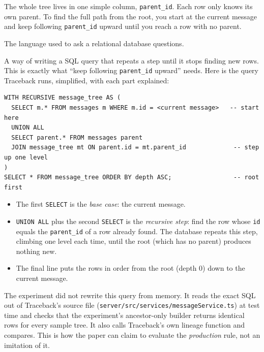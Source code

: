 \begin{plain}
The whole tree lives in one simple column, \texttt{parent\_id}. Each row only knows its own parent. To find the full path from the root, you start at the current message and keep following \texttt{parent\_id} upward until you reach a row with no parent.
\end{plain}

 The language used to ask a relational database questions.

 A way of writing a SQL query that repeats a step until it stops finding new rows. This is exactly what ``keep following \texttt{parent\_id} upward'' needs. Here is the query Traceback runs, simplified, with each part explained:

\begin{lstlisting}
WITH RECURSIVE message_tree AS (
  SELECT m.* FROM messages m WHERE m.id = <current message>   -- start here
  UNION ALL
  SELECT parent.* FROM messages parent
  JOIN message_tree mt ON parent.id = mt.parent_id             -- step up one level
)
SELECT * FROM message_tree ORDER BY depth ASC;                 -- root first
\end{lstlisting}

\begin{itemize}
\item The first \texttt{SELECT} is the \emph{base case}: the current message.
\item \texttt{UNION ALL} plus the second \texttt{SELECT} is the \emph{recursive step}: find the row whose \texttt{id} equals the \texttt{parent\_id} of a row already found. The database repeats this step, climbing one level each time, until the root (which has no parent) produces nothing new.
\item The final line puts the rows in order from the root (depth 0) down to the current message.
\end{itemize}

\begin{why}
The experiment did not rewrite this query from memory. It reads the exact SQL out of Traceback's source file (\texttt{server/src/services/messageService.ts}) at test time and checks that the experiment's ancestor-only builder returns identical rows for every sample tree. It also calls Traceback's own lineage function and compares. This is how the paper can claim to evaluate the \emph{production} rule, not an imitation of it.
\end{why}

